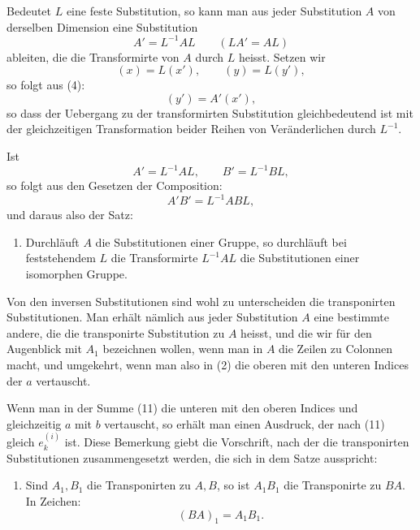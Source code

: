 \documentclass[11pt]{article}
\begin{document}
Bedeutet $L$ eine feste Substitution, so kann man aus jeder Substitution $A$ von derselben Dimension eine Substitution
\begin{equation}
A'=L^{-1}AL\qquad(LA'=AL)
\tag{21}
\end{equation}
ableiten, die die Transformirte von $A$ durch $L$ heisst. Setzen wir
\begin{equation}
(x)=L(x'),\qquad (y)=L(y'),
\tag{22}
\end{equation}
so folgt aus (4):
\begin{equation}
(y')=A'(x'),
\tag{23}
\end{equation}
so dass der Uebergang zu der transformirten Substitution gleichbedeutend ist mit der gleichzeitigen Transformation beider Reihen von Veränderlichen durch $L^{-1}$.

Ist
\[
A'=L^{-1}AL,
\qquad
B'=L^{-1}BL,
\]
so folgt aus den Gesetzen der Composition:
\[
A'B'=L^{-1}ABL,
\]
und daraus also der Satz:
\begin{enumerate}[label=\arabic*.,leftmargin=2.2em,start=7]
\item Durchläuft $A$ die Substitutionen einer Gruppe, so durchläuft bei feststehendem $L$ die Transformirte $L^{-1}AL$ die Substitutionen einer isomorphen Gruppe.
\end{enumerate}

Von den inversen Substitutionen sind wohl zu unterscheiden die transponirten Substitutionen. Man erhält nämlich aus jeder Substitution $A$ eine bestimmte andere, die die transponirte Substitution zu $A$ heisst, und die wir für den Augenblick mit $A_1$ bezeichnen wollen, wenn man in $A$ die Zeilen zu Colonnen macht, und umgekehrt, wenn man also in (2) die oberen mit den unteren Indices der $a$ vertauscht.

Wenn man in der Summe (11) die unteren mit den oberen Indices und gleichzeitig $a$ mit $b$ vertauscht, so erhält man einen Ausdruck, der nach (11) gleich $e^{(i)}_k$ ist. Diese Bemerkung giebt die Vorschrift, nach der die transponirten Substitutionen zusammengesetzt werden, die sich in dem Satze ausspricht:

\begin{enumerate}[label=\arabic*.,leftmargin=2.2em,start=8]
\item Sind $A_1,B_1$ die Transponirten zu $A,B$, so ist $A_1B_1$ die Transponirte zu $BA$. In Zeichen:
\begin{equation}
(BA)_1=A_1B_1.
\tag{24}
\end{equation}
\end{enumerate}
\end{document}
